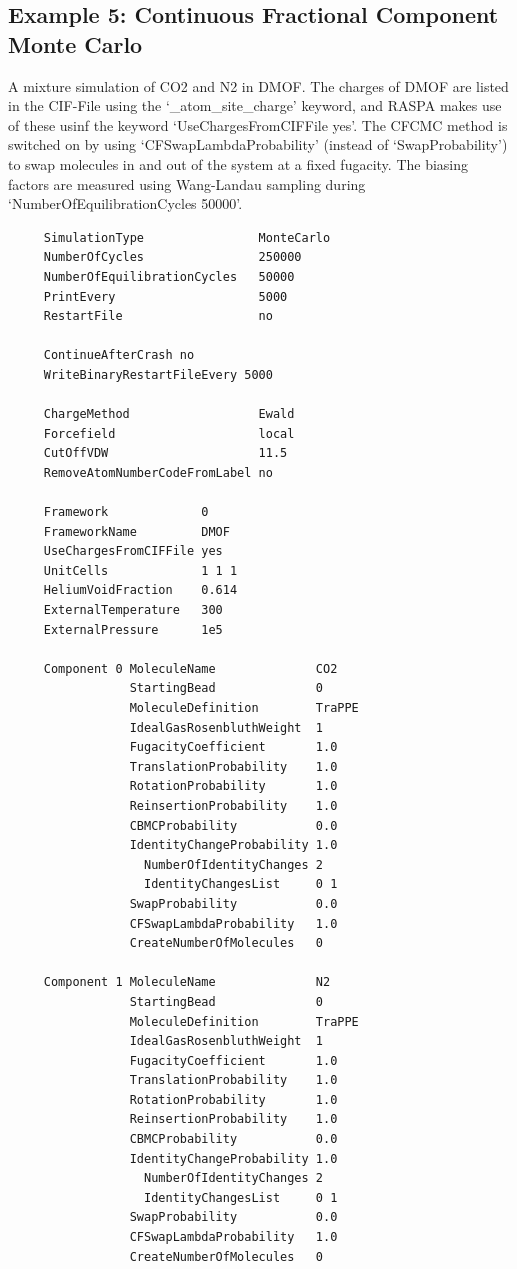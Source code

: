 \subsection*{Example 5: Continuous Fractional Component Monte Carlo}

A mixture simulation of CO2 and N2 in DMOF. The charges of DMOF are listed in the CIF-File using the `\_atom\_site\_charge' keyword,
and RASPA makes use of these usinf the keyword `UseChargesFromCIFFile yes'.
The CFCMC method is switched on by using `CFSwapLambdaProbability' (instead of `SwapProbability') to swap molecules in and out of the system at a fixed fugacity.
The biasing factors are measured using Wang-Landau sampling during `NumberOfEquilibrationCycles 50000'.

\begin{tiny}
\begin{verbatim}
     SimulationType                MonteCarlo
     NumberOfCycles                250000
     NumberOfEquilibrationCycles   50000
     PrintEvery                    5000
     RestartFile                   no
     
     ContinueAfterCrash no
     WriteBinaryRestartFileEvery 5000
     
     ChargeMethod                  Ewald
     Forcefield                    local
     CutOffVDW                     11.5
     RemoveAtomNumberCodeFromLabel no
     
     Framework             0
     FrameworkName         DMOF
     UseChargesFromCIFFile yes
     UnitCells             1 1 1
     HeliumVoidFraction    0.614
     ExternalTemperature   300
     ExternalPressure      1e5
     
     Component 0 MoleculeName              CO2
                 StartingBead              0
                 MoleculeDefinition        TraPPE
                 IdealGasRosenbluthWeight  1
                 FugacityCoefficient       1.0
                 TranslationProbability    1.0
                 RotationProbability       1.0
                 ReinsertionProbability    1.0
                 CBMCProbability           0.0
                 IdentityChangeProbability 1.0
                   NumberOfIdentityChanges 2
                   IdentityChangesList     0 1
                 SwapProbability           0.0
                 CFSwapLambdaProbability   1.0
                 CreateNumberOfMolecules   0
     
     Component 1 MoleculeName              N2
                 StartingBead              0
                 MoleculeDefinition        TraPPE
                 IdealGasRosenbluthWeight  1
                 FugacityCoefficient       1.0
                 TranslationProbability    1.0
                 RotationProbability       1.0
                 ReinsertionProbability    1.0
                 CBMCProbability           0.0
                 IdentityChangeProbability 1.0
                   NumberOfIdentityChanges 2
                   IdentityChangesList     0 1
                 SwapProbability           0.0
                 CFSwapLambdaProbability   1.0
                 CreateNumberOfMolecules   0
\end{verbatim}
\end{tiny}

